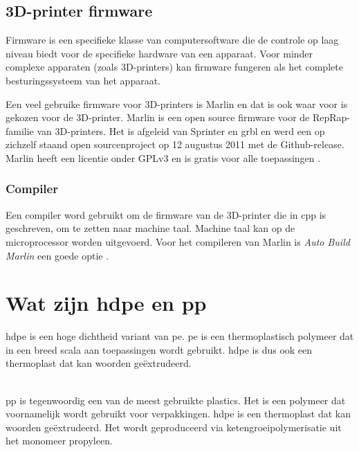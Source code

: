 \subsection{3D-printer firmware}

Firmware is een specifieke klasse van computersoftware die de controle op laag
niveau biedt voor de specifieke hardware van een apparaat.  Voor minder
complexe apparaten (zoals 3D-printers) kan firmware fungeren als het complete
besturingssysteem van het apparaat.

Een veel gebruike firmware voor 3D-printers is Marlin en dat is ook waar voor
is gekozen voor de 3D-printer.  Marlin is een open source firmware voor de
RepRap-familie van 3D-printers. Het is afgeleid van Sprinter en grbl en werd
een op zichzelf staand open sourcenproject op 12 augustus 2011 met de
Github-release. Marlin heeft een licentie onder GPLv3 en is gratis voor alle
toepassingen \cite{Marlin}. 

\subsubsection{Compiler}

Een compiler word gebruikt om de firmware van de 3D-printer die in \ac{cpp} is
geschreven, om te zetten naar machine taal. Machine taal kan op de
microprocessor worden uitgevoerd.  Voor het compileren van Marlin is \emph{Auto
Build Marlin} een goede optie \cite{Auto_Build_Marlin}.


\section{Wat zijn \ac{hdpe} en \ac{pp}}

\ac{hdpe} is een hoge dichtheid variant van \ac{pe}. \ac{pe} is een
thermoplastisch polymeer dat in een breed scala aan toepassingen wordt
gebruikt. \ac{hdpe} is dus ook een thermoplast dat kan woorden geëxtrudeerd.\\\

\noindent \ac{pp} is tegenwoordig een van de meest gebruikte plastics. Het is
een polymeer dat voornamelijk wordt gebruikt voor verpakkingen. \ac{hdpe} is
een thermoplast dat kan woorden geëxtrudeerd. Het wordt geproduceerd via
ketengroeipolymerisatie uit het monomeer propyleen.

